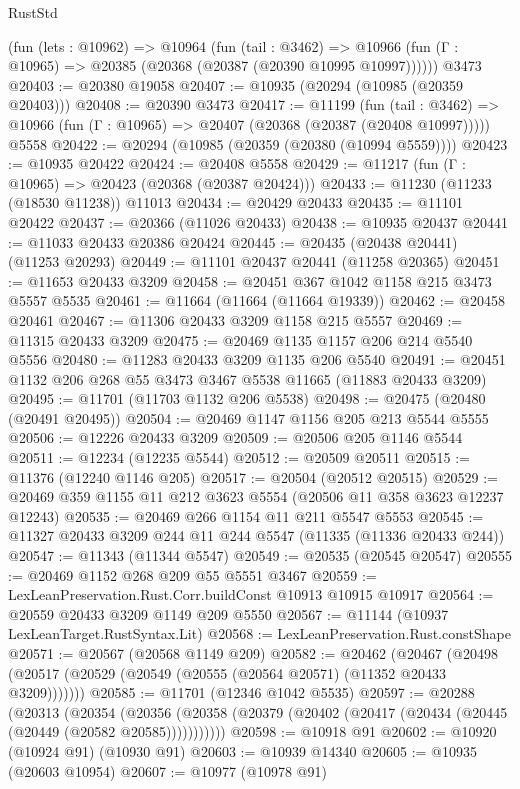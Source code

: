 \begin{lexlean}{RustStd}
\begin{coremodule}
{\begin{coremodule}
{{{{{{{{{{{{{{{{{{{{{{{{{{{{{{{{{{{{{{{{{{{{{{{{{{{{{{{{{{{{{{{{{{{{{{{{{{{{{{{{{{{{{    (fun (lets : @10962) =>
    @10964
      (fun (tail : @3462) =>
      @10966 (fun (Γ : @10965) => @20385 (@20368 (@20387 (@20390 @10995 @10997))))))
    @3473
@20403 := @20380 @19058
@20407 := @10935 (@20294 (@10985 (@20359 @20403)))
@20408 := @20390 @3473
@20417 := @11199
    (fun (tail : @3462) => @10966 (fun (Γ : @10965) => @20407 (@20368 (@20387 (@20408 @10997)))))
    @5558
@20422 := @20294 (@10985 (@20359 (@20380 (@10994 @5559))))
@20423 := @10935 @20422
@20424 := @20408 @5558
@20429 := @11217 (fun (Γ : @10965) => @20423 (@20368 (@20387 @20424)))
@20433 := @11230 (@11233 (@18530 @11238)) @11013
@20434 := @20429 @20433
@20435 := @11101 @20422
@20437 := @20366 (@11026 @20433)
@20438 := @10935 @20437
@20441 := @11033 @20433 @20386 @20424
@20445 := @20435 (@20438 @20441) (@11253 @20293)
@20449 := @11101 @20437 @20441 (@11258 @20365)
@20451 := @11653 @20433 @3209
@20458 := @20451 @367 @1042 @1158 @215 @3473 @5557 @5535
@20461 := @11664 (@11664 (@11664 @19339))
@20462 := @20458 @20461
@20467 := @11306 @20433 @3209 @1158 @215 @5557
@20469 := @11315 @20433 @3209
@20475 := @20469 @1135 @1157 @206 @214 @5540 @5556
@20480 := @11283 @20433 @3209 @1135 @206 @5540
@20491 := @20451 @1132 @206 @268 @55 @3473 @3467 @5538 @11665 (@11883 @20433 @3209)
@20495 := @11701 (@11703 @1132 @206 @5538)
@20498 := @20475 (@20480 (@20491 @20495))
@20504 := @20469 @1147 @1156 @205 @213 @5544 @5555
@20506 := @12226 @20433 @3209
@20509 := @20506 @205 @1146 @5544
@20511 := @12234 (@12235 @5544)
@20512 := @20509 @20511
@20515 := @11376 (@12240 @1146 @205)
@20517 := @20504 (@20512 @20515)
@20529 := @20469 @359 @1155 @11 @212 @3623 @5554 (@20506 @11 @358 @3623 @12237 @12243)
@20535 := @20469 @266 @1154 @11 @211 @5547 @5553
@20545 := @11327 @20433 @3209 @244 @11 @244 @5547 (@11335 (@11336 @20433 @244))
@20547 := @11343 (@11344 @5547)
@20549 := @20535 (@20545 @20547)
@20555 := @20469 @1152 @268 @209 @55 @5551 @3467
@20559 := LexLeanPreservation.Rust.Corr.buildConst @10913 @10915 @10917
@20564 := @20559 @20433 @3209 @1149 @209 @5550
@20567 := @11144 (@10937 LexLeanTarget.RustSyntax.Lit)
@20568 := LexLeanPreservation.Rust.constShape
@20571 := @20567 (@20568 @1149 @209)
@20582 := @20462
    (@20467 (@20498 (@20517 (@20529 (@20549 (@20555 (@20564 @20571) (@11352 @20433 @3209)))))))
@20585 := @11701 (@12346 @1042 @5535)
@20597 := @20288
    (@20313
      (@20354
        (@20356 (@20358 (@20379 (@20402 (@20417 (@20434 (@20445 (@20449 (@20582 @20585)))))))))))
@20598 := @10918 @91
@20602 := @10920 (@10924 @91) (@10930 @91)
@20603 := @10939 @14340
@20605 := @10935 (@20603 @10954)
@20607 := @10977 (@10978 @91)
}}}}}}}}}}}}}}}}}}}}}}}}}}}}}}}}}}}}}}}}}}}}}}}}}}}}}}}}}}}}}}}}}}}}}}}}}}}}}}}}}}}}}
\end{coremodule}}
\end{coremodule}
\end{lexlean}

